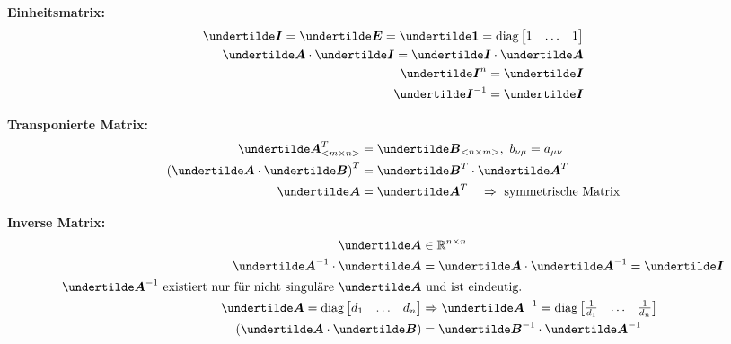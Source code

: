 \textbf{Einheitsmatrix:}
\begin{align*}
\ma{I} = \ma{E} = \ma{1} = \text{diag}\begin{bmatrix}1 & \ldots & 1\end{bmatrix}\\
\ma{A} \cdot \ma{I} = \ma{I} \cdot \ma{A}\\
\ma{I}^n = \ma{I}\\
\ma{I}^{-1} = \ma{I}
\end{align*}

\textbf{Transponierte Matrix:}
\begin{align*}
\ma{A}_{<m\times n>}^T &= \ma{B}_{<n\times m>},\ b_{\nu\mu} = a_{\mu\nu}\\
\left(\ma{A} \cdot \ma{B}\right)^T &= \ma{B}^T \cdot \ma{A}^T\\
\ma{A} &= \ma{A}^T \quad \Rightarrow \text{ symmetrische Matrix}
\end{align*}

\textbf{Inverse Matrix:}
\begin{align*}
\ma{A} &\in \mathbb{R}^{n\times n}\\
\ma{A}^{-1} \cdot \ma{A} &= \ma{A} \cdot \ma{A}^{-1} = \ma{I}\\
\text{$\ma{A}^{-1}$ existiert nur für nicht singuläre $\ma{A}$}&\text{ und ist eindeutig.}\\
\ma{A} = \text{diag}\begin{bmatrix}d_1 & \ldots & d_n\end{bmatrix} & \Rightarrow \ma{A}^{-1} = \text{diag}\begin{bmatrix}\frac{1}{d_1} & \ldots & \frac{1}{d_n}\end{bmatrix}\\
\left(\ma{A} \cdot \ma{B}\right) &= \ma{B}^{-1} \cdot \ma{A}^{-1}
\end{align*}

